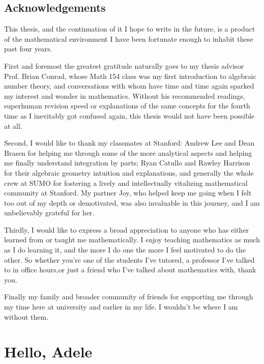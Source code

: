\documentclass[11pt, x11names, openany]{book}
\begin{document}
\newpage


\newpage
\section*{Acknowledgements}

This thesis, and the continuation of it I hope to write in the future, is a product of the mathematical environment I have been fortunate enough to inhabit these past four years.

First and foremost the greatest gratitude naturally goes to my thesis advisor Prof. Brian Conrad, whose Math 154 class was my first introduction to algebraic number theory, and conversations with whom have time and time again sparked my interest and wonder in mathematics. Without his recommended readings, superhuman revision speed or explanations of the same concepts for the fourth time as I inevitably got confused again, this thesis would not have been possible at all. 

Second, I would like to thank my classmates at Stanford: Andrew Lee and Dean Brasen for helping me through some of the more analytical aspects and helping me finally understand integration by parts; Ryan Catullo and Rawley Harrison for their algebraic geometry intuition and explanations, and generally the whole crew at SUMO for fostering a lively and intellectually vitalizing mathematical community at Stanford. My partner Joy, who helped keep me going when I felt too out of my depth or demotivated, was also invaluable in this journey, and I am unbelievably grateful for her.

Thirdly, I would like to express a broad appreciation to anyone who has either learned from or taught me mathematically. I enjoy teaching mathematics as much as I do learning it, and the more I do one the more I feel motivated to do the other. So whether you're one of the students I've tutored, a professor I've talked to in office hours,or just a friend who I've talked about mathematics with, thank you.

Finally my family and broader community of friends for supporting me through my time here at university and earlier in my life. I wouldn't be where I am without them.





\chapter{Hello, Adele}
\label{chapter: Hello, Adele}
\end{document}
